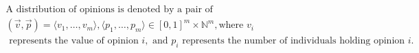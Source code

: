 \documentclass[preview]{standalone}
\begin{document}
\begin{align*}
\text{A distribution of opinions is denoted by a pair of }\\(\vec{v}, \vec{p}) = \langle v_1,\ldots,v_m \rangle, \langle p_1,\ldots,p_m \rangle \in [0,1]^m \times \mathbb{N}^m,\text{where } v_i \\\text{ represents the value of opinion } i, \text{ and } p_i \text{ represents the number of individuals holding opinion } i.
\end{align*}
\end{document}
